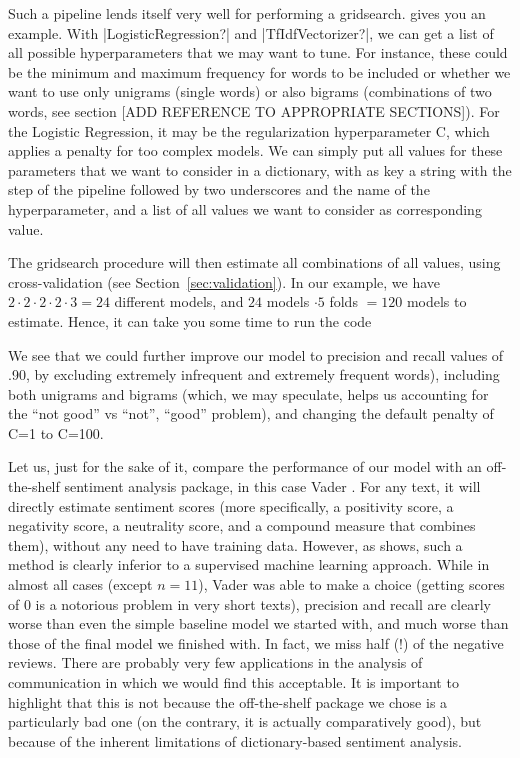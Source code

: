 
Such a pipeline lends itself very well for performing a
gridsearch.  gives you an example.  With
|LogisticRegression?| and |TfIdfVectorizer?|, we can get a list of all
possible hyperparameters that we may want to tune. For instance, these
could be the minimum and maximum frequency for words to be included or
whether we want to use only unigrams (single words) or also bigrams
(combinations of two words, see section [ADD REFERENCE TO APPROPRIATE
  SECTIONS]). For the Logistic Regression, it may be the
regularization hyperparameter C, which applies a penalty for too
complex models.  We can simply put all values for these parameters
that we want to consider in a dictionary, with as key a string with
the step of the pipeline followed by two underscores and the name of
the hyperparameter, and a list of all values we want to consider as
corresponding value.

The gridsearch procedure will then estimate all combinations of all
values, using cross-validation (see Section~\ref{sec:validation}). In
our example, we have $2 \cdot 2 \cdot 2 \cdot 2 \cdot 3 = 24$
different models, and $24$ models $\cdot 5$ folds $= 120$ models to
estimate. Hence, it can take you some time to run the code

We see that we could further improve our model to precision and recall
values of .90, by excluding extremely infrequent and extremely
frequent words), including both unigrams and bigrams (which, we may
speculate, helps us accounting for the ``not good'' vs ``not'',
``good'' problem), and changing the default penalty of C=1 to C=100.

Let us, just for the sake of it, compare the performance of our model
with an off-the-shelf sentiment analysis package, in this case Vader
\citep{Hutto2014}. For any text, it will directly estimate sentiment
scores (more specifically, a positivity score, a negativity score, a
neutrality score, and a compound measure that combines them), without
any need to have training data. However, as  shows, such
a method is clearly inferior to a supervised machine learning
approach. While in almost all cases (except $n=11$), Vader was able to
make a choice (getting scores of 0 is a notorious problem in very
short texts), precision and recall are clearly worse than even the
simple baseline model we started with, and much worse than those of
the final model we finished with. In fact, we miss half (!) of the
negative reviews. There are probably very few applications in the
analysis of communication in which we would find this acceptable.
It is important to highlight that this is not because the off-the-shelf
package we chose is a particularly bad one (on the contrary, it is
actually comparatively good), but because of the inherent limitations
of dictionary-based sentiment analysis.

